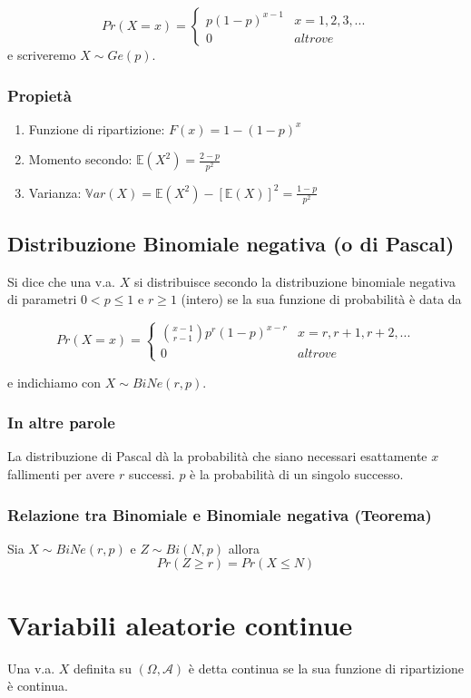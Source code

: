 \documentclass[a4paper]{report}
\begin{document}
  \[
    Pr(X=x)=
      \begin{cases}
        p(1-p)^{x-1} & x = 1,2,3,... \\
        0 & altrove
      \end{cases}
  \]
  e scriveremo $X \sim Ge(p)$.
  \subsubsection{Propietà}
  \begin{enumerate}
    \item Funzione di ripartizione: $F(x) =   1-(1-p)^x$
    \item Momento secondo: $ \mathbb{E}(X^2) = \frac{2-p}{p^2} $
    \item Varianza: $ \mathbb{V}ar(X) = \mathbb{E}(X^2) - [\mathbb{E}(X)]^2 = \frac{1-p}{p^2} $
  \end{enumerate}



  \subsection{Distribuzione Binomiale negativa (o di Pascal)}
  Si dice che una v.a. $X$ si distribuisce secondo la distribuzione binomiale negativa di parametri $0 < p \leq 1$ e $r \geq 1$ (intero) se la sua funzione di probabilità è data da

  \[
    Pr(X=x)=
      \begin{cases}
          \binom{x-1}{r-1} p^r (1-p)^{x-r} & x=r, r+1, r+2,... \\
          0 & altrove
      \end{cases}
  \]

  e indichiamo con $X \sim BiNe(r,p)$.

  \subsubsection{In altre parole}
  La distribuzione di Pascal dà la probabilità che siano necessari esattamente $x$ fallimenti per avere $r$ successi. $p$ è la probabilità di un singolo successo.

  \subsubsection{Relazione tra Binomiale e Binomiale negativa (Teorema)}
  Sia $X \sim BiNe(r,p)$ e $Z \sim Bi(N,p)$ allora
  \[ Pr(Z \geq r) = Pr(X \leq N) \]

  \section{Variabili aleatorie continue}
  Una v.a. $X$ definita su $(\Omega, \mathcal{A})$ è detta continua se la sua funzione di ripartizione è continua.
\end{document}
